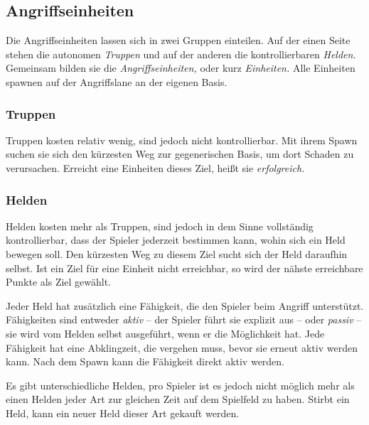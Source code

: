\subsection{Angriffseinheiten}

Die Angriffseinheiten lassen sich in zwei Gruppen einteilen. Auf der einen
Seite stehen die autonomen \emph{Truppen} und auf der anderen die
kontrollierbaren \emph{Helden.} Gemeinsam bilden sie die
\emph{Angriffseinheiten,} oder kurz \emph{Einheiten.} Alle Einheiten spawnen
auf der Angriffslane an der eigenen Basis.


\subsubsection{Truppen}

Truppen kosten relativ wenig, sind jedoch nicht kontrollierbar. Mit ihrem Spawn
suchen sie sich den kürzesten Weg zur gegenerischen Basis, um dort Schaden zu
verursachen. Erreicht eine Einheiten dieses Ziel, heißt sie \emph{erfolgreich.}


\subsubsection{Helden}

Helden kosten mehr als Truppen, sind jedoch in dem Sinne vollständig
kontrollierbar, dass der Spieler jederzeit bestimmen kann, wohin sich ein Held
bewegen soll. Den kürzesten Weg zu diesem Ziel sucht sich der Held daraufhin
selbst. Ist ein Ziel für eine Einheit nicht erreichbar, so wird der nähste
erreichbare Punkte als Ziel gewählt.

Jeder Held hat zusätzlich eine Fähigkeit, die den Spieler beim Angriff
unterstützt. Fähigkeiten sind entweder \emph{aktiv} -- der Spieler führt sie
explizit aus -- oder \emph{passiv} -- sie wird vom Helden selbst ausgeführt,
wenn er die Möglichkeit hat. Jede Fähigkeit hat eine Abklingzeit, die vergehen
muss, bevor sie erneut aktiv werden kann. Nach dem Spawn kann die Fähigkeit
direkt aktiv werden.

Es gibt unterschiedliche Helden, pro Spieler ist es jedoch nicht möglich mehr
als einen Helden jeder Art zur gleichen Zeit auf dem Spielfeld zu haben.
Stirbt ein Held, kann ein neuer Held dieser Art gekauft werden.

